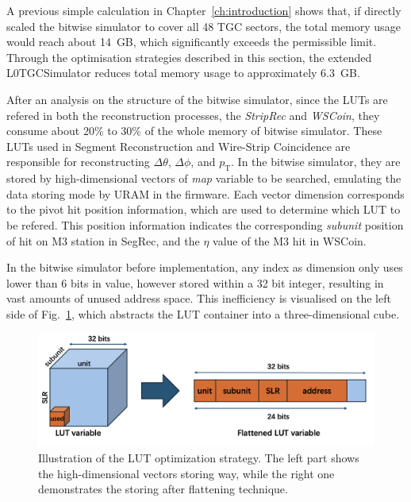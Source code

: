 A previous simple calculation in Chapter~\ref{ch:introduction} shows that, if directly scaled the bitwise simulator to cover all 48 TGC sectors, the total memory usage would reach about 14~GB, which significantly exceeds the permissible limit. Through the optimisation strategies described in this section, the extended L0TGCSimulator reduces total memory usage to approximately 6.3~GB.

After an analysis on the structure of the bitwise simulator, since the LUTs are refered in both the reconstruction processes, the \textit{StripRec} and \textit{WSCoin}, they consume about 20\% to 30\% of the whole memory of bitwise simulator. These LUTs used in Segment Reconstruction and Wire-Strip Coincidence are responsible for reconstructing $\Delta\theta$, $\Delta\phi$, and $p_{\mathrm{T}}$. In the bitwise simulator, they are stored by high-dimensional vectors of \textit{map} variable to be searched, emulating the data storing mode by URAM in the firmware. Each vector dimension corresponds to the pivot hit position information, which are used to determine which LUT to be refered. This position information indicates the corresponding \textit{subunit} position of hit on M3 station in SegRec, and the $\eta$ value of the M3 hit in WSCoin. 

In the bitwise simulator before implementation, any index as dimension only uses lower than 6 bits in value, however stored within a 32 bit integer, resulting in vast amounts of unused address space. This inefficiency is visualised on the left side of Fig.~\ref{fig:LUT_optimization}, which abstracts the LUT container into a three-dimensional cube.
\begin{figure}[htbp]
  \centering
  \includegraphics[width=1.0\textwidth]{figs/chapter5/LUT_optimization.png}
  \caption{Illustration of the LUT optimization strategy. The left part shows the high-dimensional vectors storing way, while the right one demonstrates the storing after flattening technique.}
  \label{fig:LUT_optimization}
\end{figure}

